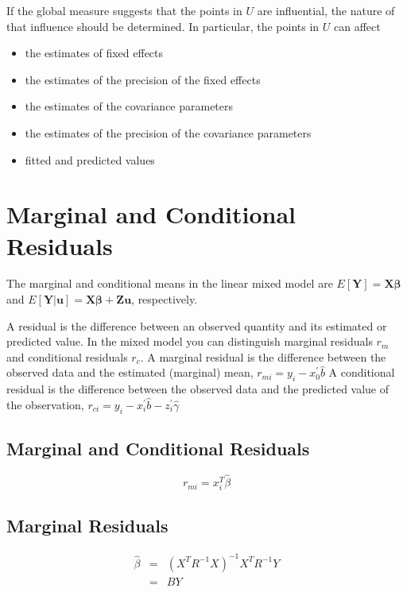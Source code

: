 \documentclass[12pt, a4paper]{report}
\theoremstyle{plain}
\theoremstyle{definition}
\theoremstyle{remark}
\begin{document}
If the global measure suggests that the points in $U$ are influential, the nature of that influence should be determined. In particular, the points in $U$ can affect
\begin{itemize}
\item the estimates of fixed effects
\item the estimates of the precision of the fixed effects
\item the estimates of the covariance parameters
\item the estimates of the precision of the covariance parameters
\item fitted and predicted values
\end{itemize}


\newpage
\section{Marginal and Conditional Residuals} %
The marginal and conditional means in the linear mixed model are
$E[\boldsymbol{Y}] = \boldsymbol{X}\boldsymbol{\beta}$ and
$E[\boldsymbol{Y|\boldsymbol{u}}] = \boldsymbol{X}\boldsymbol{\beta} + \boldsymbol{Z}\boldsymbol{u}$, respectively.

A residual is the difference between an observed quantity and its estimated or predicted value. In the mixed
model you can distinguish marginal residuals $r_m$ and conditional residuals $r_c$. A marginal residual is the
difference between the observed data and the estimated (marginal) mean, $r_{mi} = y_i - x_0^{\prime} \hat{b}$
A conditional residual is the difference between the observed data and the predicted value of the observation,
$r_{ci} = y_i - x_i^{\prime} \hat{b} - z_i^{\prime} \hat{\gamma}$

\subsection{Marginal and Conditional Residuals}

\begin{equation}
r_{mi}=x^{T}_{i}\hat{\beta}
\end{equation}

\subsection{Marginal Residuals}
\begin{eqnarray}
\hat{\beta} &=& (X^{T}R^{-1}X)^{-1}X^{T}R^{-1}Y \nonumber \\
&=& BY \nonumber
\end{eqnarray}
\end{document}
